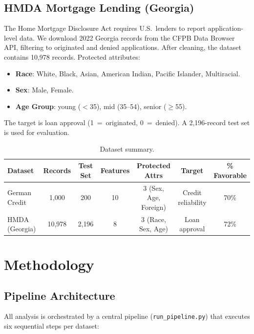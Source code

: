 \documentclass[11pt,a4paper]{article}
\begin{document}
\subsection{HMDA Mortgage Lending (Georgia)}

The Home Mortgage Disclosure Act requires U.S.\ lenders to report
application-level data. We download 2022 Georgia records from the
CFPB Data Browser API, filtering to originated and denied applications.
After cleaning, the dataset contains 10{,}978 records.
Protected attributes:
\begin{itemize}[nosep]
  \item \textbf{Race}: White, Black, Asian, American Indian, Pacific Islander, Multiracial.
  \item \textbf{Sex}: Male, Female.
  \item \textbf{Age Group}: young ($<$35), mid (35--54), senior ($\geq$55).
\end{itemize}
The target is loan approval (1~=~originated, 0~=~denied). A 2{,}196-record
test set is used for evaluation.

\begin{table}[H]
\centering
\caption{Dataset summary.}
\label{tab:datasets}
\begin{tabular}{lcccccc}
\toprule
\textbf{Dataset} & \textbf{Records} & \textbf{Test Set} & \textbf{Features} & \textbf{Protected Attrs} & \textbf{Target} & \textbf{\% Favorable} \\
\midrule
German Credit    & 1{,}000 & 200   & 10 & 3 (Sex, Age, Foreign) & Credit reliability & 70\% \\
HMDA (Georgia)   & 10{,}978 & 2{,}196 & 8  & 3 (Race, Sex, Age)    & Loan approval      & 72\% \\
\bottomrule
\end{tabular}
\end{table}

\section{Methodology}

\subsection{Pipeline Architecture}

All analysis is orchestrated by a central pipeline (\texttt{run\_pipeline.py})
that executes six sequential steps per dataset:
\end{document}
